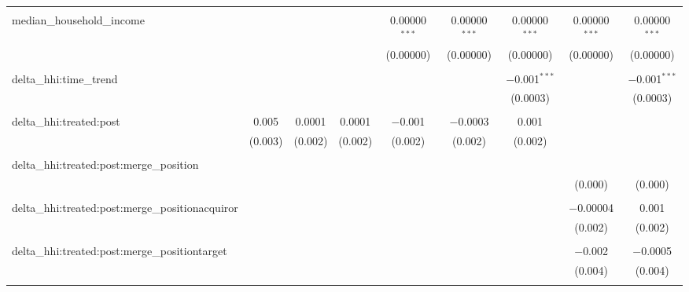 \begin{table}[H]
{\begin{tabular}{@{\extracolsep{5pt}}lcccccccc}
   & & & & & & & & \\  

  median\_household\_income &  &  &  & 0.00000$^{***}$ & 0.00000$^{***}$ & 0.00000$^{***}$ & 0.00000$^{***}$ & 0.00000$^{***}$ \\  

   &  &  &  & (0.00000) & (0.00000) & (0.00000) & (0.00000) & (0.00000) \\  

   & & & & & & & & \\  

  delta\_hhi:time\_trend &  &  &  &  &  & $-$0.001$^{***}$ &  & $-$0.001$^{***}$ \\  

   &  &  &  &  &  & (0.0003) &  & (0.0003) \\  

   & & & & & & & & \\  

  delta\_hhi:treated:post & 0.005 & 0.0001 & 0.0001 & $-$0.001 & $-$0.0003 & 0.001 &  &  \\  

   & (0.003) & (0.002) & (0.002) & (0.002) & (0.002) & (0.002) &  &  \\  

   & & & & & & & & \\  

  delta\_hhi:treated:post:merge\_position &  &  &  &  &  &  &  &  \\  

   &  &  &  &  &  &  & (0.000) & (0.000) \\  

   & & & & & & & & \\  

  delta\_hhi:treated:post:merge\_positionacquiror &  &  &  &  &  &  & $-$0.00004 & 0.001 \\  

   &  &  &  &  &  &  & (0.002) & (0.002) \\  

   & & & & & & & & \\  

  delta\_hhi:treated:post:merge\_positiontarget &  &  &  &  &  &  & $-$0.002 & $-$0.0005 \\  

   &  &  &  &  &  &  & (0.004) & (0.004) \\  

   & & & & & & & & \\  


\end{tabular}}
\end{table}
